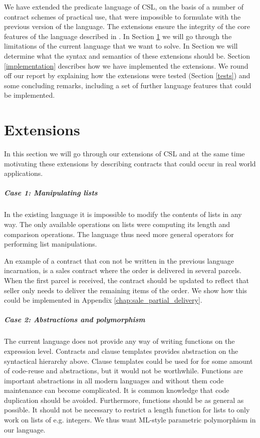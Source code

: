 \documentclass[10pt,a4paper,final,oneside,openany,article]{memoir}
\begin{document}
We have extended the predicate language of CSL, on the basis of a
number of contract schemes of practical use, that were impossible to
formulate with the previous version of the language. The extensions
ensure the integrity of the core features of the language described in
\cite{hvitved10}.  In Section \ref{extensions} we will go through the
limitations of the current language that we want to solve. In Section
we will determine what the syntax and semantics of these extensions
should be. Section \ref{implementation} describes how we have
implemented the extensions. We round off our report by explaining how
the extensions were tested (Section \ref{tests}) and some concluding
remarks, including a set of further language features that could be
implemented.

\chapter{Extensions}
\label{extensions} In this section we will go through our extensions
of CSL and at the same time motivating these extensions by describing
contracts that could occur in real world applications.

\paragraph{Case 1: Manipulating lists} In the existing language it is
impossible to modify the contents of lists in any way. The only
available operations on lists were computing its length and comparison
operations. The language thus need more general operators for
performing list manipulations.

An example of a contract that con not be written in the previous
language incarnation, is a sales contract where the order is delivered
in several parcels. When the first parcel is received, the contract
should be updated to reflect that seller only needs to deliver the
remaining items of the order.  We show how this could be implemented
in Appendix \ref{chap:sale_partial_delivery}.

\paragraph{Case 2: Abstractions and polymorphism} The current language
does not provide any way of writing functions on the expression
level. Contracts and clause templates provides abstraction on the
syntactical hierarchy above. Clause templates could be used for for
some amount of code-reuse and abstractions, but it would not be
worthwhile. Functions are important abstractions in all modern
languages and without them code maintenance can become complicated. It
is common knowledge that code duplication should be avoided.
Furthermore, functions should be as general as possible. It should not
be necessary to restrict a length function for lists to only work on
lists of e.g. integers. We thus want ML-style parametric polymorphism
in our language.
\end{document}
